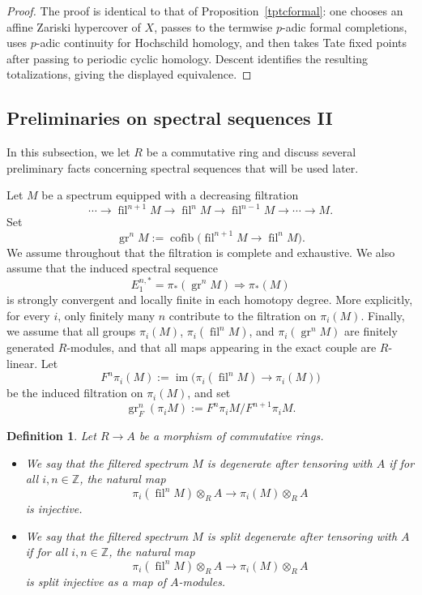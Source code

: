 \documentclass[11pt]{amsart}
\newtheorem{defn}[lemma]{Definition}
\numberwithin{equation}{section}
\newcommand{\Z}{\mathbb{Z}}
\newcommand{\gr}{{\operatorname{gr}}}
\newcommand{\fil}{{\operatorname{fil}}}
\numberwithin{equation}{section}
\begin{document}
\begin{proof}
The proof is identical to that of Proposition~\ref{tptcformal}: one chooses an affine Zariski hypercover of $X$, passes to the termwise $p$-adic formal completions, uses $p$-adic continuity for Hochschild homology, and then takes Tate fixed points after passing to periodic cyclic homology. Descent identifies the resulting totalizations, giving the displayed equivalence.
\end{proof}

\subsection{Preliminaries on spectral sequences II}

In this subsection, we let $R$ be a commutative ring and discuss several preliminary facts concerning spectral sequences that will be used later.

Let $M$ be a spectrum equipped with a decreasing filtration
\begin{equation*}
  \cdots \longrightarrow \fil^{n+1}M
  \longrightarrow \fil^n M
  \longrightarrow \fil^{n-1}M
  \longrightarrow \cdots
  \longrightarrow M.
\end{equation*}
Set
\begin{equation*}
  \gr^n M :=
  \operatorname{cofib}\bigl(\fil^{n+1}M\to \fil^n M\bigr).
\end{equation*}
We assume throughout that the filtration is complete and exhaustive. We also assume that the induced spectral sequence
\begin{equation*}
  E_1^{n,*}=\pi_*(\gr^n M)\Longrightarrow \pi_*(M)
\end{equation*}
is strongly convergent and locally finite in each homotopy degree. More explicitly, for every $i$, only finitely many $n$ contribute to the filtration on $\pi_i(M)$. Finally, we assume that all groups $\pi_i(M)$, $\pi_i(\fil^n M)$, and $\pi_i(\gr^n M)$ are finitely generated $R$-modules, and that all maps appearing in the exact couple are $R$-linear. Let
\begin{equation*}
  F^n\pi_i(M):=
  \operatorname{im}\bigl(\pi_i(\fil^nM)\to \pi_i(M)\bigr)
\end{equation*}
be the induced filtration on $\pi_i(M)$, and set
\[
  \gr_F^n(\pi_i M):=F^n \pi_i M/F^{n+1} \pi_i M.
\]

\begin{defn}
Let $R \to A$ be a morphism of commutative rings.
\begin{itemize}
  \item[(1)] We say that the filtered spectrum $M$ is \emph{degenerate after tensoring with $A$} if for all $i,n\in\Z$, the natural map
  \[
    \pi_i(\fil^n M) \otimes_R A \to \pi_i(M)\otimes_R A
  \]
  is injective.

  \item[(2)] We say that the filtered spectrum $M$ is \emph{split degenerate after tensoring with $A$} if for all $i,n\in\Z$, the natural map
  \[
    \pi_i(\fil^n M) \otimes_R A \to \pi_i(M)\otimes_R A
  \]
  is split injective as a map of $A$-modules.
\end{itemize}
\end{defn}
\end{document}

